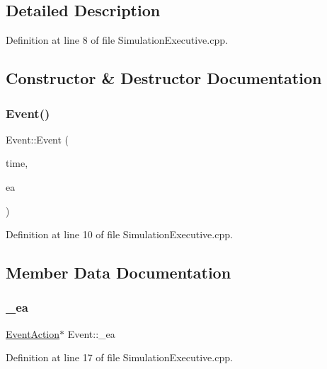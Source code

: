 \subsection{Detailed Description}


Definition at line 8 of file Simulation\+Executive.\+cpp.



\subsection{Constructor \& Destructor Documentation}
\mbox{\label{struct_event_a5236b45d6ac7c6ce784c3e39fed03d7d}} 
\subsubsection{\texorpdfstring{Event()}{Event()}}
{\footnotesize\ttfamily Event\+::\+Event (\begin{DoxyParamCaption}\item[{\hyperlink{_simulation_executive_8h_ac2d3e0ba793497bcca555c7c2cf64ff3}{Time}}]{time,  }\item[{\hyperlink{class_event_action}{Event\+Action} $\ast$}]{ea }\end{DoxyParamCaption})\hspace{0.3cm}{\ttfamily [inline]}}



Definition at line 10 of file Simulation\+Executive.\+cpp.



\subsection{Member Data Documentation}
\mbox{\label{struct_event_aacbbfbf051167338e9febaaa5aad5b73}} 
\subsubsection{\texorpdfstring{\+\_\+ea}{\_ea}}
{\footnotesize\ttfamily \hyperlink{class_event_action}{Event\+Action}$\ast$ Event\+::\+\_\+ea}



Definition at line 17 of file Simulation\+Executive.\+cpp.

\mbox{\label{struct_event_a6bc8ec440b4f0b617d58af059e44e43e}} 
